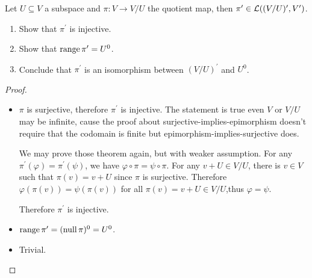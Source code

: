 \documentclass[../main.tex]{subfiles}
\begin{document}
\begin{exercise}
  Let $U \subseteq V$ a subspace and $\pi : V \rightarrow V/U$ the quotient map, then $\pi^\prime \in \mathcal{L}((V/U)^\prime, V^\prime)$.
  \begin{enumerate}
    \item Show that $\pi^\prime$ is injective.
    \item Show that $\operatorname{range} \pi^\prime = U^0$.
    \item Conclude that $\pi^\prime$ is an isomorphism between $(V/U)^\prime$ and $U^0$.
  \end{enumerate}
\end{exercise}
\begin{proof}
  ~
  \begin{itemize}
    \item $\pi$ is surjective, therefore $\pi^\prime$ is injective. The statement is true
          even $V$ or $V/U$ may be infinite, cause the proof about surjective-implies-epimorphism
          doesn't require that the codomain is finite but epimorphism-implies-surjective does.

          We may prove those theorem again, but with weaker assumption.
          For any $\pi^\prime(\varphi) = \pi^\prime(\psi)$, we have $\varphi \circ \pi = \psi \circ \pi$.
          For any $v + U \in V/U$, there is $v \in V$ such that $\pi(v) = v + U$ since $\pi$ is surjective.
          Therefore $\varphi(\pi(v)) = \psi(\pi(v))$ for all $\pi(v) = v + U \in V/U$,thus $\varphi = \psi$.

          Therefore $\pi^\prime$ is injective.
    \item $\operatorname{range} \pi^\prime = (\operatorname{null} \pi)^0 = U^0$.
    \item Trivial.
  \end{itemize}
\end{proof}
\end{document}
